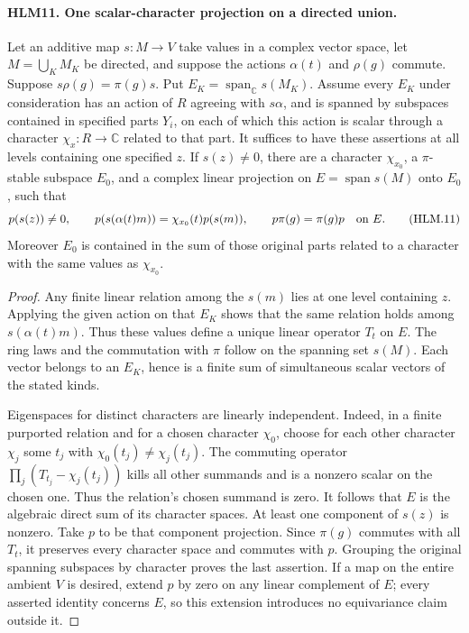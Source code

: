 \paragraph{HLM11. One scalar-character projection on a directed union.}
\label{claim:HLM11}
Let an additive map \(s:M\to V\) take values in a complex vector
space, let \(M=\bigcup_KM_K\) be directed, and suppose the
actions \(\alpha(t)\) and \(\rho(g)\) commute.  Suppose
\(s\rho(g)=\pi(g)s\).  Put
\(E_K=\operatorname{span}_{\mathbb C}s(M_K)\).
Assume every \(E_K\) under consideration has an action of
\(R\) agreeing with \(s\alpha\), and is spanned by
subspaces contained in specified parts \(Y_i\), on each of
which this action is scalar through a character
\(\chi_x:R\to\mathbb C\) related to that part.
It suffices to have these assertions at all levels containing
one specified \(z\).  If \(s(z)\ne0\), there are a character
\(\chi_{x_0}\), a \(\pi\)-stable subspace \(E_0\), and
a complex linear projection on \(E=\operatorname{span}s(M)\)
onto \(E_0\), such that
\[
 p(s(z))\ne0,\qquad p(s(\alpha(t)m))=\chi_{x_0}(t)p(s(m)),
 \qquad p\pi(g)=\pi(g)p\quad\hbox{on }E.
 \tag{HLM.11}
\]
Moreover \(E_0\) is contained in the sum of those original
parts related to a character with the same values as
\(\chi_{x_0}\).
\begin{proof}
Any finite linear relation among the \(s(m)\) lies at one
level containing \(z\).  Applying the given action on that
\(E_K\) shows that the same relation holds among
\(s(\alpha(t)m)\).  Thus these values define a unique
linear operator \(T_t\) on \(E\).  The ring laws and the
commutation with \(\pi\) follow on the spanning set \(s(M)\).
Each vector belongs to an \(E_K\), hence is a finite sum
of simultaneous scalar vectors of the stated kinds.

Eigenspaces for distinct characters are linearly independent.
Indeed, in a finite purported relation and for a chosen
character \(\chi_0\), choose for each other character
\(\chi_j\) some \(t_j\) with
\(\chi_0(t_j)\ne\chi_j(t_j)\).  The commuting operator
\(\prod_j(T_{t_j}-\chi_j(t_j))\) kills all other summands
and is a nonzero scalar on the chosen one.  Thus the relation's
chosen summand is zero.  It follows that \(E\) is the
algebraic direct sum of its character spaces.  At least one
component of \(s(z)\) is nonzero.  Take \(p\) to be that
component projection.  Since \(\pi(g)\) commutes with all
\(T_t\), it preserves every character space and commutes
with \(p\).  Grouping the original spanning subspaces by
character proves the last assertion.  If a map on the entire
ambient \(V\) is desired, extend \(p\) by zero on any
linear complement of \(E\); every asserted identity concerns
\(E\), so this extension introduces no equivariance claim
outside it.
\end{proof}

